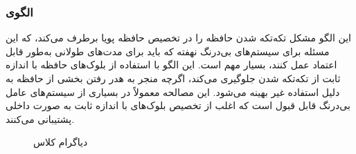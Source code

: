 \subsubsection{الگوی }
\label{memFixSizeBufSec}
\begin{RTL}
این الگو \cite{ref4}
مشکل تکه‌تکه شدن حافظه را در تخصیص حافظه پویا برطرف می‌کند،
که این مسئله برای سیستم‌های بی‌درنگ نهفته که باید برای مدت‌های طولانی
به‌طور قابل اعتماد عمل کنند، بسیار مهم است.
این الگو با استفاده از بلوک‌های حافظه با اندازه ثابت از تکه‌تکه شدن
جلوگیری می‌کند، اگرچه منجر به هدر رفتن بخشی از حافظه به دلیل
استفاده غیر بهینه می‌شود. این مصالحه معمولاً در بسیاری از
سیستم‌های عامل بی‌درنگ قابل قبول است که اغلب از
تخصیص بلوک‌های با اندازه ثابت به صورت داخلی پشتیبانی می‌کنند.
\end{RTL}
\begin{figure}[h!]
\centering
{}
\caption{دیاگرام کلاس }
\label{memFixSizeBufClassDiag}
\end{figure}
